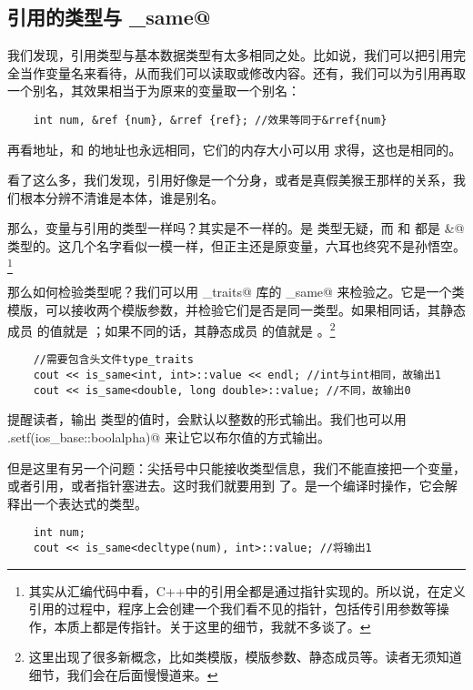 \subsection*{引用的类型与 \lstinline@is_same@}
我们发现，引用类型与基本数据类型有太多相同之处。比如说，我们可以把引用完全当作变量名来看待，从而我们可以读取或修改内容。还有，我们可以为引用再取一个别名，其效果相当于为原来的变量取一个别名：
\begin{lstlisting}
    int num, &ref {num}, &rref {ref}; //效果等同于&rref{num}
\end{lstlisting}
再看地址，\lstinline@num@ 和 \lstinline@ref@ 的地址也永远相同，它们的内存大小可以用 \lstinline@sizeof@ 求得，这也是相同的。\par
看了这么多，我们发现，引用好像是一个分身，或者是真假美猴王那样的关系，我们根本分辨不清谁是本体，谁是别名。\par
那么，变量与引用的类型一样吗？其实是不一样的。\lstinline@num@ 是 \lstinline@int@ 类型无疑，而 \lstinline@ref@ 和 \lstinline@rref@ 都是 \lstinline@int&@ 类型的。这几个名字看似一模一样，但正主还是原变量，六耳也终究不是孙悟空。\footnote{其实从汇编代码中看，C++中的引用全都是通过指针实现的。所以说，在定义引用的过程中，程序上会创建一个我们看不见的指针，包括传引用参数等操作，本质上都是传指针。关于这里的细节，我就不多谈了。}\par
那么如何检验类型呢？我们可以用 \lstinline@type_traits@ 库的 \lstinline@is_same@ 来检验之。它是一个类模版，可以接收两个模版参数，并检验它们是否是同一类型。如果相同话，其静态成员 \lstinline@value@ 的值就是 \lstinline@true@；如果不同的话，其静态成员 \lstinline@value@ 的值就是 \lstinline@false@。\footnote{这里出现了很多新概念，比如类模版，模版参数、静态成员等。读者无须知道细节，我们会在后面慢慢道来。}
\begin{lstlisting}
    //需要包含头文件type_traits
    cout << is_same<int, int>::value << endl; //int与int相同，故输出1
    cout << is_same<double, long double>::value; //不同，故输出0
\end{lstlisting}
提醒读者，\lstinline@cout@ 输出 \lstinline@bool@ 类型的值时，会默认以整数的形式输出。我们也可以用 \lstinline@cout.setf(ios_base::boolalpha)@ 来让它以布尔值的方式输出。\par
但是这里有另一个问题：尖括号中只能接收类型信息，我们不能直接把一个变量，或者引用，或者指针塞进去。这时我们就要用到 \lstinline@decltype@ 了。\lstinline@decltype@ 是一个编译时操作，它会解释出一个表达式的类型。
\begin{lstlisting}
    int num;
    cout << is_same<decltype(num), int>::value; //将输出1
\end{lstlisting}
